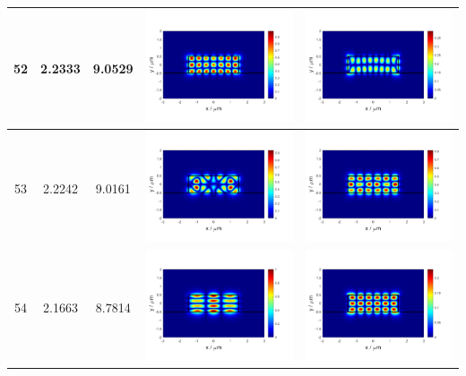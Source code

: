 \documentclass{assignment}
\begin{document}
\begin{sol}
\begin{itemize}
\begin{longtable}[c]{|c|c|c|c|c|}
            52 & 2.2333 & 9.0529 & \includegraphics[width=.3\columnwidth]{Assignment-2-mode-52-Ex.png} & \includegraphics[width=.3\columnwidth]{Assignment-2-mode-52-Ey.png} \\ \hline
            53 & 2.2242 & 9.0161 & \includegraphics[width=.3\columnwidth]{Assignment-2-mode-53-Ex.png} & \includegraphics[width=.3\columnwidth]{Assignment-2-mode-53-Ey.png} \\ \hline
            54 & 2.1663 & 8.7814 & \includegraphics[width=.3\columnwidth]{Assignment-2-mode-54-Ex.png} & \includegraphics[width=.3\columnwidth]{Assignment-2-mode-54-Ey.png} \\ \hline

\end{longtable}
\end{itemize}
\end{sol}
\end{document}
